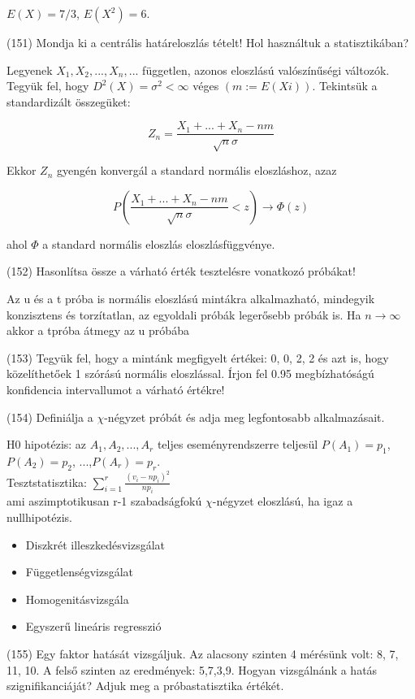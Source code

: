 \documentclass[12p]{article}
\begin{document}
$E(X) = 7/3$, $E(X^2) = 6$.

(151) Mondja ki a centrális határeloszlás tételt! Hol használtuk a statisztikában?

Legyenek $X_1 , X_2 ,..., X_n ,...$ független, azonos eloszlású valószínűségi változók. Tegyük fel, hogy $D^2(X) = \sigma^2 < \infty$ véges $(m:=E(Xi))$. Tekintsük a standardizált összegüket:

$$Z_n = \frac{X_1 + ... + X_n -nm}{\sqrt{n}\sigma}$$

Ekkor $Z_n$ gyengén konvergál a standard normális eloszláshoz,
azaz

$$P(\frac{X_1 + ... + X_n - nm}{\sqrt{n}\sigma} < z) \rightarrow \Phi(z)$$

ahol $\Phi$ a standard normális eloszlás eloszlásfüggvénye.

(152) Hasonlítsa össze a várható érték tesztelésre vonatkozó próbákat!

Az u és a t próba is normális eloszlású mintákra alkalmazható, mindegyik konzisztens és torzítatlan, az egyoldali próbák legerősebb próbák is. Ha $n \rightarrow \infty$ akkor a tpróba átmegy az u próbába

(153) Tegyük fel, hogy a mintánk megfigyelt értékei: 0, 0, 2, 2 és azt is, hogy közelíthetőek 1 szórású normális eloszlással. Írjon fel 0.95 megbízhatóságú konfidencia intervallumot a
várható értékre!

(154) Definiálja a $\chi$-négyzet próbát és adja meg legfontosabb alkalmazásait.

H0 hipotézis: az $A_1, A_2, ..., A_r$ teljes eseményrendszerre teljesül $P(A_1)=p_1$, $P(A_2)=p_2$, ...,$P(A_r)=p_r$.\\
Tesztstatisztika: $\displaystyle{ \sum^r_{i=1} \frac{(v_i - np_i)^2}{np_i}}$\\
ami aszimptotikusan r-1 szabadságfokú $\chi$-négyzet eloszlású, ha igaz a nullhipotézis. 

\begin{itemize}
	\item Diszkrét illeszkedésvizsgálat
	\item Függetlenségvizsgálat
	\item Homogenitásvizsgála
	\item Egyszerű lineáris regresszió
\end{itemize}

(155) Egy faktor hatását vizsgáljuk. Az alacsony szinten 4 mérésünk volt: 8, 7, 11, 10. A felső
szinten az eredmények: 5,7,3,9. Hogyan vizsgálnánk a hatás szignifikanciáját? Adjuk meg
a próbastatisztika értékét.
\end{document}
